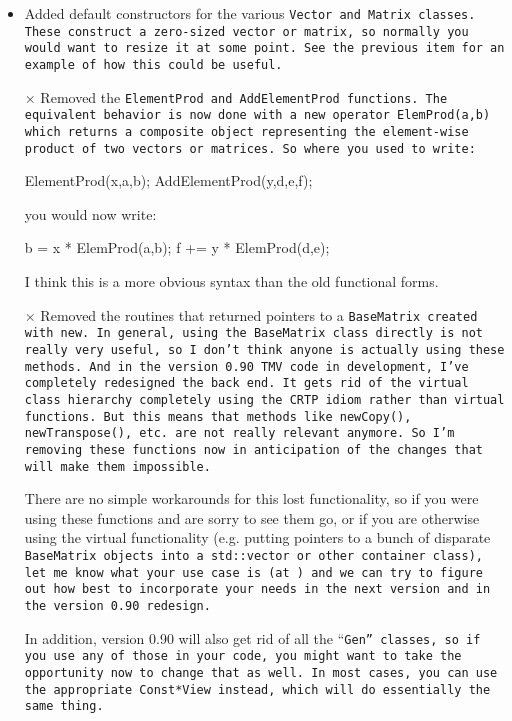\begin{itemize}
\item
Added default constructors for the various \tt{Vector} and \tt{Matrix} classes.  These construct a zero-sized vector or matrix, so normally you would want to resize it at some point.  See the previous item for an example of how this could be useful.

\item[$\times$] Removed the \tt{ElementProd} and \tt{AddElementProd} functions.  The equivalent behavior is now done with a new operator \tt{ElemProd(a,b)} which returns a composite object representing the element-wise product of two vectors or matrices.  So where you used to write:
\begin{tmvcode}
ElementProd(x,a,b);
AddElementProd(y,d,e,f);
\end{tmvcode}
you would now write:
\begin{tmvcode}
b = x * ElemProd(a,b);
f += y * ElemProd(d,e);
\end{tmvcode}
I think this is a more obvious syntax than the old functional forms.

\item[$\times$] 
Removed the routines that returned pointers to a \tt{BaseMatrix} created with \tt{new}.  In general, using the \tt{BaseMatrix} class directly is not really very useful, so I don't think anyone is actually using these methods.  And in the version 0.90 TMV code in development, I've completely redesigned the back end.  It gets rid of the virtual class hierarchy completely using the CRTP idiom rather than virtual functions.  But this means that methods like \tt{newCopy()}, \tt{newTranspose()}, etc. are not really relevant anymore.  So I'm removing these functions now in anticipation of the changes that will make them impossible.

There are no simple workarounds for this lost functionality, so if you were using these functions and are sorry to see them go, or if you are otherwise using the virtual functionality (e.g. putting pointers to a bunch of disparate \tt{BaseMatrix} objects into a \tt{std::vector} or other container class), let me know what your use case is (at \mygroup) and we can try to figure out how best to incorporate your needs in the next version and in the version 0.90 redesign.

In addition, version 0.90 will also get rid of all the ``\tt{Gen}'' classes,
so if you use any of those in your code, you might want to take the opportunity now to change that as well.  In most cases, you can use the appropriate \tt{Const*View} instead, which will do essentially the same thing.


\end{itemize}
